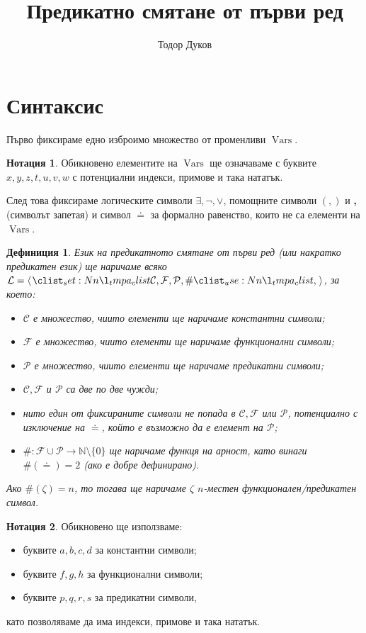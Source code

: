 \documentclass[12pt]{article}
\title{Предикатно смятане от първи ред}
\author{Тодор Дуков}
\date{}
\newcommand{\N}{\mathbb{N}}
\newcommand{\vars}{\operatorname{Vars}}
\newcommand{\calL}{\mathcal{L}}
\newcommand{\calF}{\mathcal{F}}
\newcommand{\calP}{\mathcal{P}}
\newcommand{\calC}{\mathcal{C}}
\newtheorem*{definition}{Дефиниция}
\theoremstyle{definition}
\newtheorem*{notation}{Нотация}
\begin{document}
\maketitle

\section{Синтаксис}

Първо фиксираме едно изброимо множество от променливи $\vars$.
\begin{notation}
	Обикновено елементите на $\vars$ ще означаваме с буквите $x, y, z, t, u, v, w$ с потенциални индекси, примове и така нататък.
\end{notation}
След това фиксираме логическите символи $\exists, \neg, \lor$, помощните символи $(, )$ и \textbf{,} (символът запетая) и символ $\doteq$ за формално равенство, които не са елементи на $\vars$.

\begin{definition}
	Език на предикатното смятане от първи ред (или накратко предикатен език) ще наричаме всяко $\calL = \opair{\calC, \calF, \calP, \#}$, за което:
	\begin{itemize}
		\item $\calC$ е множество, чиито елементи ще наричаме константни символи;
		\item $\calF$ е множество, чиито елементи ще наричаме функционални символи;
		\item $\calP$ е множество, чиито елементи ще наричаме предикатни символи;
		\item $\calC, \calF$ и $\calP$ са две по две чужди;
		\item нито един от фиксираните символи не попада в $\calC, \calF$ или $\calP$, потенциално с изключение на $\doteq$, който е възможно да е елемент на $\calP$;
		\item $\# : \calF \cup \calP \rightarrow \N \setminus \{ 0 \}$ ще наричаме функця на арност, като винаги $\#(\doteq) = 2$ (ако е добре дефинирано).
	\end{itemize}
	Ако $\#(\zeta) = n$, то тогава ще наричаме $\zeta$ $n$-местен функционален/предикатен символ.
\end{definition}

\newpage

\begin{notation}
	Обикновено ще използваме:
	\begin{itemize}
		\item буквите $a, b, c, d$ за константни символи;
		\item буквите $f, g, h$ за функционални символи;
		\item буквите $p, q, r, s$ за предикатни символи,
	\end{itemize}
	като позволяваме да има индекси, примове и така нататък.
\end{notation}
\end{document}
